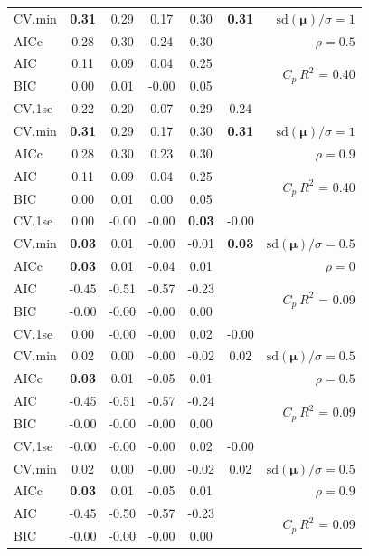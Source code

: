 \documentclass[12pt]{article}
\newcommand{\mr}[1]{\mathrm{#1}}
\newcommand{\bm}[1]{\mathbf{#1}}
\begin{document}
\begin{table}[p]
\begin{center}
\begin{tabular}{l*{5}{c}|r}
CV.min & {\bf 0.31} & 0.29 & 0.17 & 0.30 & {\bf 0.31} &  $\mr{sd}(\bm{\mu})/\sigma=1$ \\
AICc & 0.28 & 0.30 & 0.24 & 0.30 & & $\rho=0.5$ \\
AIC & 0.11 & 0.09 & 0.04 & 0.25 & & \multirow{2}{*}{$C_p ~ R^2$ = 0.40} \\
BIC & 0.00 & 0.01 & -0.00 & 0.05 & & \\
 \hline 
CV.1se & 0.22 & 0.20 & 0.07 & 0.29 & 0.24 &\\
CV.min & {\bf 0.31} & 0.29 & 0.17 & 0.30 & {\bf 0.31} &  $\mr{sd}(\bm{\mu})/\sigma=1$ \\
AICc & 0.28 & 0.30 & 0.23 & 0.30 & & $\rho=0.9$ \\
AIC & 0.11 & 0.09 & 0.04 & 0.25 & & \multirow{2}{*}{$C_p ~ R^2$ = 0.40} \\
BIC & 0.00 & 0.01 & 0.00 & 0.05 & & \\
 \hline 
CV.1se & 0.00 & -0.00 & -0.00 & {\bf 0.03} & -0.00 &\\
CV.min & {\bf 0.03} & 0.01 & -0.00 & -0.01 & {\bf 0.03} &  $\mr{sd}(\bm{\mu})/\sigma=0.5$ \\
AICc & {\bf 0.03} & 0.01 & -0.04 & 0.01 & & $\rho=0$ \\
AIC & -0.45 & -0.51 & -0.57 & -0.23 & & \multirow{2}{*}{$C_p ~ R^2$ = 0.09} \\
BIC & -0.00 & -0.00 & -0.00 & 0.00 & & \\
 \hline 
CV.1se & 0.00 & -0.00 & -0.00 & 0.02 & -0.00 &\\
CV.min & 0.02 & 0.00 & -0.00 & -0.02 & 0.02 &  $\mr{sd}(\bm{\mu})/\sigma=0.5$ \\
AICc & {\bf 0.03} & 0.01 & -0.05 & 0.01 & & $\rho=0.5$ \\
AIC & -0.45 & -0.51 & -0.57 & -0.24 & & \multirow{2}{*}{$C_p ~ R^2$ = 0.09} \\
BIC & -0.00 & -0.00 & -0.00 & 0.00 & & \\
 \hline 
CV.1se & -0.00 & -0.00 & -0.00 & 0.02 & -0.00 &\\
CV.min & 0.02 & 0.00 & -0.00 & -0.02 & 0.02 &  $\mr{sd}(\bm{\mu})/\sigma=0.5$ \\
AICc & {\bf 0.03} & 0.01 & -0.05 & 0.01 & & $\rho=0.9$ \\
AIC & -0.45 & -0.50 & -0.57 & -0.23 & & \multirow{2}{*}{$C_p ~ R^2$ = 0.09} \\
BIC & -0.00 & -0.00 & -0.00 & 0.00 & & \\
 \hline 
\end{tabular}
\end{center}
\vspace{-1cm}
\end{table}
\end{document}
